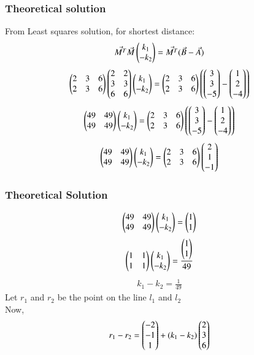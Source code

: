 \documentclass{beamer}
\begin{document}
\begin{frame}
\frametitle{Theoretical solution}
From Least squares solution, for shortest distance:
\begin{align}
    \Vec{M^T}\Vec{M}\begin{pmatrix}k_1\\-k_2\end{pmatrix}=\Vec{M^T}(\Vec{B}-\Vec{A})
\end{align}
\begin{align}
    \begin{pmatrix}2&3&6\\2&3&6\end{pmatrix}\begin{pmatrix}2&2\\3&3\\6&6\end{pmatrix}\begin{pmatrix}k_1\\-k_2\end{pmatrix}=\begin{pmatrix}2&3&6\\2&3&6\end{pmatrix}\left(\begin{pmatrix}3\\3\\-5\end{pmatrix}-\begin{pmatrix}1\\2\\-4\end{pmatrix}\right)
\end{align}
\begin{align}
\begin{pmatrix}49&49\\49&49\end{pmatrix}\begin{pmatrix}k_1\\-k_2\end{pmatrix}=\begin{pmatrix}2&3&6\\2&3&6\end{pmatrix}\left(\begin{pmatrix}3\\3\\-5\end{pmatrix}-\begin{pmatrix}1\\2\\-4\end{pmatrix}\right)
\end{align}
\begin{align}
    \begin{pmatrix}49&49\\49&49\end{pmatrix}\begin{pmatrix}k_1\\-k_2\end{pmatrix}=\begin{pmatrix}2&3&6\\2&3&6\end{pmatrix}\begin{pmatrix}2\\1\\-1\end{pmatrix}
\end{align}






\end{frame}
\begin{frame}
\frametitle{Theoretical Solution}
    \begin{align}
   \begin{pmatrix}49&49\\49&49\end{pmatrix}\begin{pmatrix}k_1\\-k_2\end{pmatrix}=\begin{pmatrix}1\\1\end{pmatrix}
\end{align}
\begin{align}
   \begin{pmatrix}1&1\\1&1\end{pmatrix}\begin{pmatrix}k_1\\-k_2\end{pmatrix}=\frac{\begin{pmatrix}1\\1\end{pmatrix}}{49}
\end{align}
\begin{align}
     k_1-k_2=\frac{1}{49}
\end{align}
Let $r_1$ and $r_2$ be the point on the line $l_1$ and $l_2$\\
Now,
\begin{align}
    r_1-r_2=\begin{pmatrix}-2\\-1\\1\end{pmatrix}+(k_1-k_2)\begin{pmatrix}2\\3\\6\end{pmatrix}
\end{align}



\end{frame}
\end{document}
